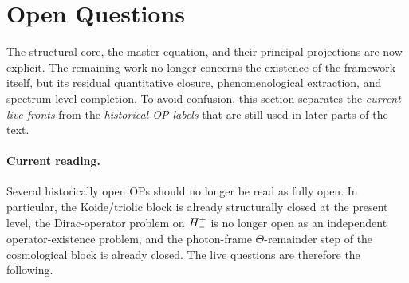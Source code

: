 \section*{Open Questions}

The structural core, the master equation, and their principal projections are
now explicit. The remaining work no longer concerns the existence of the
framework itself, but its residual quantitative closure, phenomenological
extraction, and spectrum-level completion. To avoid confusion, this section
separates the \emph{current live fronts} from the \emph{historical OP labels}
that are still used in later parts of the text.

\paragraph{Current reading.}
Several historically open OPs should no longer be read as fully open. In
particular, the Koide/triolic block is already structurally closed at the
present level, the Dirac-operator problem on $H^+_-$ is no longer open as
an independent operator-existence problem, and the photon-frame
$\Theta$-remainder step of the cosmological block is already closed. The live
questions are therefore the following.

